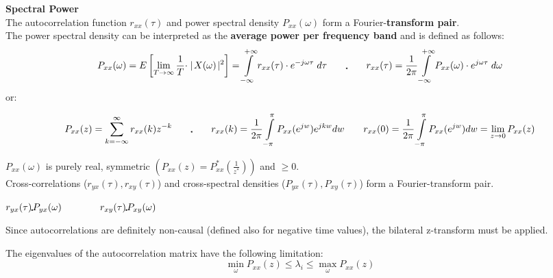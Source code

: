 		\textbf{Spectral Power}\\
		The autocorrelation function $r_{xx}(\tau)$ and power spectral density $P_{xx}(\omega)$ form a
		Fourier-\textbf{transform pair}. \\ The power spectral density can be interpreted as the \textbf{average power per frequency band} and is
		defined as follows:
				$$ P_{xx}(\omega) = E\left[ \lim\limits_{T \rightarrow \infty}
											\frac{1}{T} \cdot \mid\! X(\omega) \!\mid^{2}\right]
									= \int\limits_{-\infty}^{+\infty} r_{xx}(\tau) \cdot e^{-j\omega\tau} \; d\tau
									\qquad \IFT \qquad
				r_{xx}(\tau)   = \frac{1}{2\pi} \int\limits_{-\infty}^{+\infty}
									 P_{xx}(\omega) \cdot e^{j\omega\tau} \; d\omega$$
				or:

				$$P_{xx}(z) = \sum\limits_{k=-\infty}^{\infty} r_{xx}(k)z^{-k}\qquad \IFT \qquad
				r_{xx}(k)=\frac 1{2\pi} \int \limits_{-\pi}^{\pi} P_{xx}(e^{jw})e^{jkw}dw \qquad
				r_{xx}(0) =\frac 1{2\pi} \int \limits_{-\pi}^{\pi} P_{xx}(e^{jw})dw = \lim\limits_{z \rightarrow 0} P_{xx}(z)$$

		$P_{xx}(\omega)$ is purely real, symmetric $(P_{xx}(z)=P_{xx}^*(\frac{1}{z^*}))$ and $\geq 0$. \\
		Cross-correlations ($r_{yx}(\tau), r_{xy}(\tau)$) and cross-spectral densities ($P_{yx}(\tau),
		P_{xy}(\tau)$) form a Fourier-transform pair.
		\begin{center}
		$ r_{yx}(\tau) \FT P_{yx}(\omega) \qquad \qquad r_{xy}(\tau) \FT P_{xy}(\omega)  $
		\end{center}
		Since autocorrelations are definitely non-causal (defined also for negative time values), the bilateral z-transform must be applied.

		The eigenvalues of the autocorrelation matrix have the following limitation:\\
		$$\min\limits_\omega P_{xx}(z)\leq \lambda_i \leq \max\limits_{\omega}P_{xx}(z)$$


